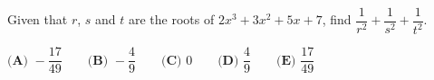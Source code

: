 Given that $r$, $s$ and $t$ are the roots of $2x^3+3x^2+5x+7$, find $\dfrac{1}{r^2}+\dfrac{1}{s^2}+\dfrac{1}{t^2}$.

$\textbf{(A) }-\dfrac{17}{49}\qquad\textbf{(B) }-\dfrac{4}{9}\qquad\textbf{(C) }0\qquad\textbf{(D) }\dfrac{4}{9}\qquad\textbf{(E) }\dfrac{17}{49}$
